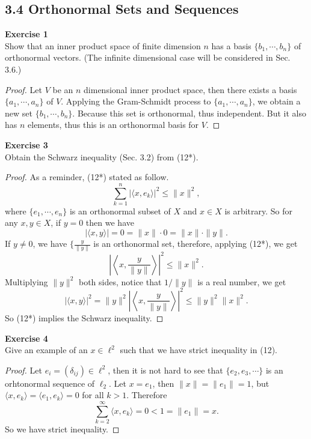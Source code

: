 \documentclass[12pt, a4paper]{article}
\theoremstyle{plain}
\newenvironment{exercise}[2][Exercise]
    { \begin{mdframed}[backgroundcolor=gray!20] \textbf{#1 #2} \\}
    {  \end{mdframed}}
\begin{document}
\subsection*{3.4 Orthonormal Sets and Sequences}

\begin{exercise}{1}
Show that an inner product space of finite dimension $n$ has a basis $\{b_1,\cdots,b_n\}$ of orthonormal vectors. (The infinite dimensional case will be considered in Sec. 3.6.)
\end{exercise}
	\begin{proof}
	Let $V$ be an $n$ dimensional inner product space, then there exists a basis $\{a_1,\cdots,a_n\}$ of $V$. Applying the Gram-Schmidt process to $\{a_1,\cdots,a_n\}$, we obtain a new set $\{b_1,\cdots,b_n\}$. Because this set is orthonormal, thus independent. But it also has $n$ elements, thus this is an orthonormal basis for $V$.
	\end{proof}

\begin{exercise}{3}
Obtain the Schwarz inequality (Sec. 3.2) from (12*).
\end{exercise}
	\begin{proof}
	As a reminder, (12*) stated as follow. 
	\[
	\sum_{k=1}^{n}{|\langle{x,e_k}\rangle|^2}\leq \|x\|^2,
	\]
	where $\{e_1,\cdots,e_n\}$ is an orthonormal subset of $X$ and $x\in X$ is arbitrary. So for any $x,y\in X$, if $y=0$ then we have
	\[
	|\langle{x,y}\rangle| = 0 = \|x\|\cdot 0=\|x\|\cdot\|y\|.
	\]
	If $y\neq 0$, we have $\{\frac{y}{\|y\|}$ is an orthonormal set, therefore, applying (12*), we get
	\[
	\left|\left\langle{x,\frac{y}{\|y\|}}\right\rangle\right|^2\leq \|x\|^2.
	\]
	Multiplying $\|y\|^2$ both sides, notice that $1/\|y\|$ is a real number, we get
	\[
	|\langle{x,y}\rangle|^2 = \|y\|^2\left|\left\langle{x,\frac{y}{\|y\|}}\right\rangle\right|^2\leq \|y\|^2\|x\|^2.
	\]
	So (12*) implies the Schwarz inequality.
	\end{proof}

\begin{exercise}{4}
Give an example of an $x\in\ell^2$ such that we have strict inequality in (12).
\end{exercise}
	\begin{proof}
	Let $e_i=(\delta_{ij})\in \ell^2$, then it is not hard to see that $\{e_2,e_3,\cdots\}$ is an orhtonormal sequence of $\ell_2$. Let $x=e_1$, then $\|x\|=\|e_1\|=1$, but $\langle{x,e_k}\rangle = \langle{e_1,e_k}\rangle = 0$ for all $k>1$. Therefore 
	\[
	\sum_{k=2}^{\infty}{\langle{x,e_k}\rangle} = 0 < 1 =\|e_1\| = x.
	\]
	So we have strict inequality.
	\end{proof}
\end{document}
